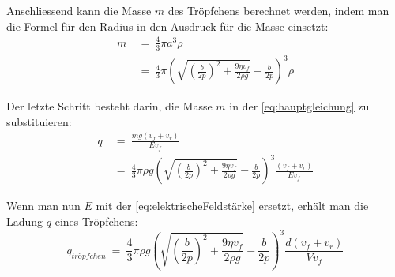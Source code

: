 \noindent Anschliessend kann die Masse $m$ des Tröpfchens berechnet werden, indem man die Formel für den Radius in den Ausdruck für die Masse einsetzt:
\begin{equation*}
	\begin{split}
		m & \ = \ \frac{4}{3}\pi a^3 \rho \\
		& \ = \ \frac{4}{3}\pi \left( \sqrt{\left( \frac{b}{2p}\right)^2 + \frac{9\eta v_f}{2\rho g}} - \frac{b}{2p} \right)^3 \rho
	\end{split}
\end{equation*}

\noindent Der letzte Schritt besteht darin, die Masse $m$ in der \autoref{eq:hauptgleichung} zu substituieren:
\begin{equation*}
	\begin{split}
		q & \ = \ \frac{m g (v_f + v_r)}{Ev_f} \\
		& \ = \ \frac{4}{3} \pi \rho g \left( \sqrt{\left( \frac{b}{2p}\right)^2 + \frac{9\eta v_f}{2\rho g}} - \frac{b}{2p} \right)^3 \frac{(v_f + v_r)}{Ev_f}
	\end{split}
\end{equation*}

\noindent Wenn man nun $E$ mit der \autoref{eq:elektrischeFeldstärke} ersetzt, erhält man die Ladung $q$ eines Tröpfchens:
\begin{equation*}
	q_{tröpfchen} \ = \ \frac{4}{3} \pi \rho g \left( \sqrt{\left( \frac{b}{2p}\right)^2 + \frac{9\eta v_f}{2\rho g}} - \frac{b}{2p} \right)^3 \frac{d(v_f + v_r)}{Vv_f}
\end{equation*}







